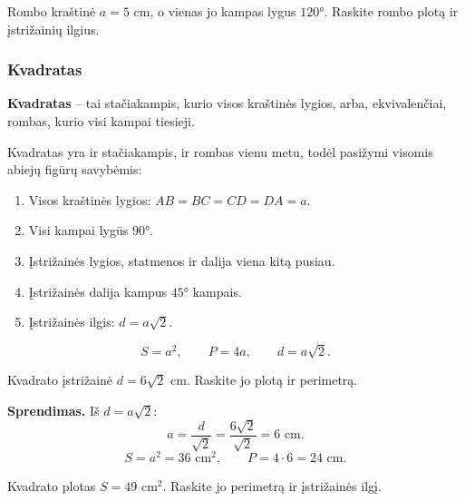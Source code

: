 \begin{exercise}
Rombo kraštinė $a = 5$ cm, o vienas jo kampas lygus $120°$. Raskite rombo plotą ir įstrižainių ilgius.
\end{exercise}

\subsubsection*{Kvadratas}

\begin{definition}[Kvadratas]
\textbf{Kvadratas} – tai stačiakampis, kurio visos kraštinės lygios, arba, ekvivalenčiai, rombas, kurio visi kampai tiesieji.
\end{definition}

Kvadratas yra ir stačiakampis, ir rombas vienu metu, todėl pasižymi visomis abiejų figūrų savybėmis:

\begin{theorem}
\begin{enumerate}
    \item Visos kraštinės lygios: $AB = BC = CD = DA = a$.
    \item Visi kampai lygūs $90°$.
    \item Įstrižainės lygios, statmenos ir dalija viena kitą pusiau.
    \item Įstrižainės dalija kampus $45°$ kampais.
    \item Įstrižainės ilgis: $d = a\sqrt{2}$.
\end{enumerate}
\end{theorem}

\begin{tcolorbox}[colback=blue!5!white, colframe=blue!60!black, title=Kvadrato formulės]
\[
S = a^2, \qquad P = 4a, \qquad d = a\sqrt{2}.
\]
\end{tcolorbox}

\begin{example}
Kvadrato įstrižainė $d = 6\sqrt{2}$ cm. Raskite jo plotą ir perimetrą.

\textbf{Sprendimas.} Iš $d = a\sqrt{2}$:
\[
a = \frac{d}{\sqrt{2}} = \frac{6\sqrt{2}}{\sqrt{2}} = 6 \text{ cm}.
\]
\[
S = a^2 = 36 \text{ cm}^2, \qquad P = 4 \cdot 6 = 24 \text{ cm}.
\]
\end{example}

\begin{exercise}
Kvadrato plotas $S = 49$ cm$^2$. Raskite jo perimetrą ir įstrižainės ilgį.
\end{exercise}

